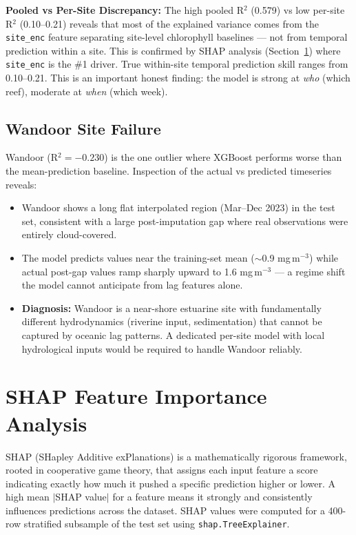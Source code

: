 \documentclass[12pt,a4paper]{report}
\begin{document}
\begin{challengebox}
\textbf{Pooled vs Per-Site Discrepancy:} The high pooled R$^2$ (0.579) vs low per-site
R$^2$ (0.10--0.21) reveals that most of the explained variance comes from the \texttt{site\_enc}
feature separating site-level chlorophyll baselines — not from temporal prediction within
a site. This is confirmed by SHAP analysis (Section~\ref{sec:shap}) where \texttt{site\_enc}
is the \#1 driver. True within-site temporal prediction skill ranges from 0.10--0.21.
This is an important honest finding: the model is strong at \textit{who} (which reef),
moderate at \textit{when} (which week).
\end{challengebox}

\subsection{Wandoor Site Failure}

Wandoor (R$^2 = -0.230$) is the one outlier where XGBoost performs worse than
the mean-prediction baseline. Inspection of the actual vs predicted timeseries reveals:
\begin{itemize}[leftmargin=*]
  \item Wandoor shows a long flat interpolated region (Mar--Dec 2023) in the test set,
    consistent with a large post-imputation gap where real observations were entirely cloud-covered.
  \item The model predicts values near the training-set mean ($\sim$0.9 mg\,m$^{-3}$) while
    actual post-gap values ramp sharply upward to 1.6 mg\,m$^{-3}$ — a regime shift
    the model cannot anticipate from lag features alone.
  \item \textbf{Diagnosis:} Wandoor is a near-shore estuarine site with fundamentally
    different hydrodynamics (riverine input, sedimentation) that cannot be captured by
    oceanic lag patterns. A dedicated per-site model with local hydrological inputs
    would be required to handle Wandoor reliably.
\end{itemize}

\section{SHAP Feature Importance Analysis}
\label{sec:shap}

SHAP (SHapley Additive exPlanations) is a mathematically rigorous framework, rooted
in cooperative game theory, that assigns each input feature a score indicating exactly
how much it pushed a specific prediction higher or lower. A high mean $|$SHAP value$|$
for a feature means it strongly and consistently influences predictions across the
dataset. SHAP values were computed for a 400-row stratified subsample of the test set
using \texttt{shap.TreeExplainer}.
\end{document}
